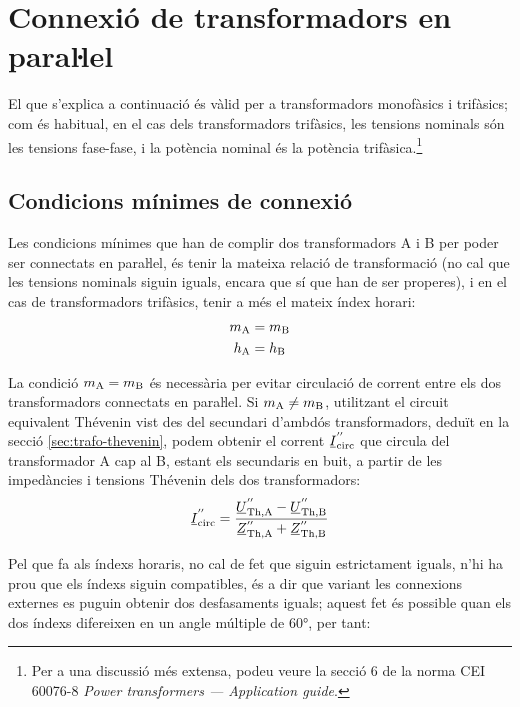 \section{Connexió de transformadors en paraŀlel}

El que s'explica a continuació és vàlid per a transformadors
monofàsics i trifàsics; com és habitual, en el cas dels
transformadors trifàsics, les tensions nominals són les tensions
fase-fase, i la potència nominal és la potència trifàsica.\footnote{Per a una discussió més extensa,  podeu veure la secció 6 de la norma CEI 60076-8 \emph{Power transformers --- Application guide}.}

\subsection{Condicions mínimes de connexió}

Les condicions mínimes que han de complir dos transformadors A i B per poder ser connectats en paraŀlel, és tenir la mateixa relació de transformació (no cal que les tensions nominals siguin iguals, encara que sí que han de ser properes), i en el cas de transformadors trifàsics, tenir a més el mateix índex horari:
\begin{align}
    m_\mathrm{A} &= m_\mathrm{B}\label{eq:connex-min-1}\\
    h_\mathrm{A} &= h_\mathrm{B}\label{eq:connex-min-2}
\end{align}

La condició $m_\mathrm{A} = m_\mathrm{B}$ és necessària per evitar circulació de corrent entre els dos transformadors connectats en paraŀlel. Si $m_\mathrm{A} \neq m_\mathrm{B}$, utilitzant el circuit equivalent  Thévenin vist des del secundari d'ambdós transformadors, deduït en la secció \vref{sec:trafo-thevenin}, podem obtenir el corrent $\cmplx{I}\ped{circ}^{''}$ que circula del transformador A cap al B, estant els secundaris en buit, a partir de les impedàncies i tensions Thévenin dels dos transformadors:
\begin{equation}
    \cmplx{I}\ped{circ}^{''} = \frac{\cmplx{U}\ped{Th,A}^{''}-\cmplx{U}\ped{Th,B}^{''}}{\cmplx{Z}\ped{Th,A}^{''}+
    \cmplx{Z}\ped{Th,B}^{''}}
\end{equation}

Pel que fa als índexs horaris, no cal de fet que siguin estrictament iguals, n'hi ha prou  que els índexs siguin compatibles, és a dir que variant les connexions externes es puguin obtenir dos desfasaments iguals; aquest fet és possible quan els dos índexs difereixen en un angle múltiple de \ang{60}, per tant:

